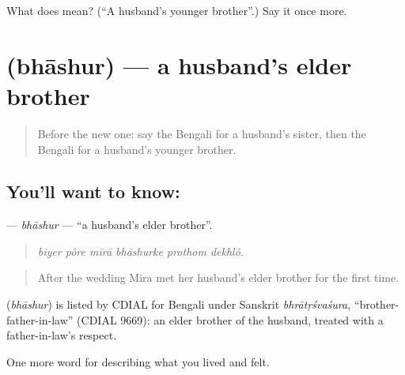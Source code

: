 \begin{tcolorbox}[breakable,colback=teal!4,colframe=teal!35!black,title={Before you move on}]
What does  mean? (\textquotedblleft{}A husband's younger brother\textquotedblright{}.) Say it once more.
\end{tcolorbox}
\section[\texorpdfstring{\bn{ভাশুর} (bhāshur)}{ভাশুর (bhāshur)}]{ (bhāshur) — a husband's elder brother}

\label{lesson:BN-C483-bhashur}



\begin{quote}
Before the new one: say the Bengali for a husband's sister, then the Bengali for a husband's younger brother.
\end{quote}

\subsection*{You'll want to know: }
\textbf{} — \emph{bhāshur} — \textquotedblleft{}a husband's elder brother\textquotedblright{}.

\begin{quote}
     
\end{quote}

\begin{quote}
\emph{biyer pôre mīrā bhāshurke prothom dekhlô.}
\end{quote}

\begin{quote}
After the wedding Mira met her husband's elder brother for the first time.
\end{quote}

\begin{cousinweb}
\textbf{} (\emph{bhāshur}) is listed by CDIAL for Bengali under Sanskrit \emph{bhrātṛśvaśura}, \textquotedblleft{}brother-father-in-law\textquotedblright{} (CDIAL 9669): an elder brother of the husband, treated with a father-in-law's respect.
\end{cousinweb}

\begin{grammarlens}[title={What you've built}]
One more word for describing what you lived and felt.
\end{grammarlens}

